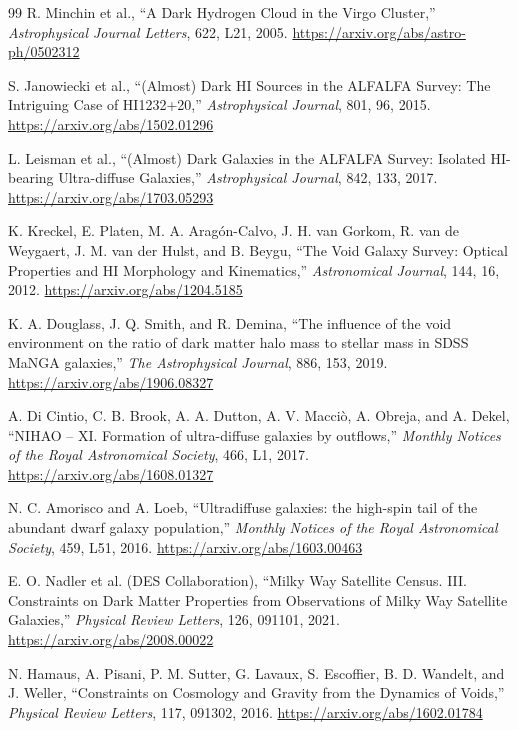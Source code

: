 \begin{thebibliography}{99}
R. Minchin et al.,
``A Dark Hydrogen Cloud in the Virgo Cluster,''
\emph{Astrophysical Journal Letters}, 622, L21, 2005.
\url{https://arxiv.org/abs/astro-ph/0502312}

S. Janowiecki et al.,
``(Almost) Dark HI Sources in the ALFALFA Survey: The Intriguing Case of HI1232+20,''
\emph{Astrophysical Journal}, 801, 96, 2015.
\url{https://arxiv.org/abs/1502.01296}

L. Leisman et al.,
``(Almost) Dark Galaxies in the ALFALFA Survey: Isolated HI-bearing Ultra-diffuse Galaxies,''
\emph{Astrophysical Journal}, 842, 133, 2017.
\url{https://arxiv.org/abs/1703.05293}

K. Kreckel, E. Platen, M. A. Arag\'on-Calvo, J. H. van Gorkom, R. van de Weygaert, J. M. van der Hulst, and B. Beygu,
``The Void Galaxy Survey: Optical Properties and HI Morphology and Kinematics,''
\emph{Astronomical Journal}, 144, 16, 2012.
\url{https://arxiv.org/abs/1204.5185}

K. A. Douglass, J. Q. Smith, and R. Demina,
``The influence of the void environment on the ratio of dark matter halo mass to stellar mass in SDSS MaNGA galaxies,''
\emph{The Astrophysical Journal}, 886, 153, 2019.
\url{https://arxiv.org/abs/1906.08327}

A. Di Cintio, C. B. Brook, A. A. Dutton, A. V. Macci\`o, A. Obreja, and A. Dekel,
``NIHAO -- XI. Formation of ultra-diffuse galaxies by outflows,''
\emph{Monthly Notices of the Royal Astronomical Society}, 466, L1, 2017.
\url{https://arxiv.org/abs/1608.01327}

N. C. Amorisco and A. Loeb,
``Ultradiffuse galaxies: the high-spin tail of the abundant dwarf galaxy population,''
\emph{Monthly Notices of the Royal Astronomical Society}, 459, L51, 2016.
\url{https://arxiv.org/abs/1603.00463}

E. O. Nadler et al. (DES Collaboration),
``Milky Way Satellite Census. III. Constraints on Dark Matter Properties from Observations of Milky Way Satellite Galaxies,''
\emph{Physical Review Letters}, 126, 091101, 2021.
\url{https://arxiv.org/abs/2008.00022}

N. Hamaus, A. Pisani, P. M. Sutter, G. Lavaux, S. Escoffier, B. D. Wandelt, and J. Weller,
``Constraints on Cosmology and Gravity from the Dynamics of Voids,''
\emph{Physical Review Letters}, 117, 091302, 2016.
\url{https://arxiv.org/abs/1602.01784}


\end{thebibliography}
